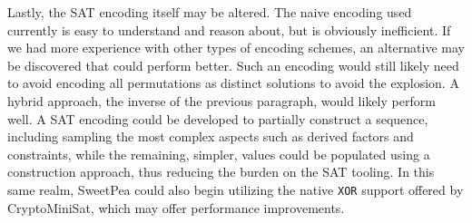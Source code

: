 Lastly, the SAT encoding itself may be altered. The naive encoding used currently is easy to understand and reason about, but is obviously inefficient. If we had more experience with other types of encoding schemes, an alternative may be discovered that could perform better. Such an encoding would still likely need to avoid encoding all permutations as distinct solutions to avoid the explosion. A hybrid approach, the inverse of the previous paragraph, would likely perform well. A SAT encoding could be developed to partially construct a sequence, including sampling the most complex aspects such as derived factors and constraints, while the remaining, simpler, values could be populated using a construction approach, thus reducing the burden on the SAT tooling. In this same realm, SweetPea could also begin utilizing the native \texttt{XOR} support offered by CryptoMiniSat, which may offer performance improvements.



